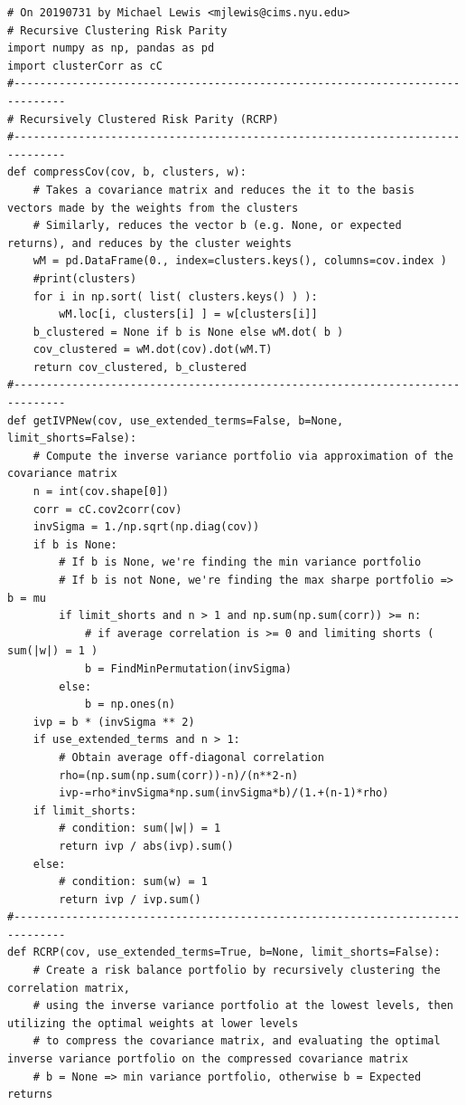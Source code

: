 \documentclass[10pt,twoside,titlepage]{article}   %
\begin{document}
\begin{lstlisting}
# On 20190731 by Michael Lewis <mjlewis@cims.nyu.edu>
# Recursive Clustering Risk Parity
import numpy as np, pandas as pd
import clusterCorr as cC
#------------------------------------------------------------------------------
# Recursively Clustered Risk Parity (RCRP)
#------------------------------------------------------------------------------
def compressCov(cov, b, clusters, w):
    # Takes a covariance matrix and reduces the it to the basis vectors made by the weights from the clusters
    # Similarly, reduces the vector b (e.g. None, or expected returns), and reduces by the cluster weights
    wM = pd.DataFrame(0., index=clusters.keys(), columns=cov.index )
    #print(clusters)
    for i in np.sort( list( clusters.keys() ) ):
        wM.loc[i, clusters[i] ] = w[clusters[i]]
    b_clustered = None if b is None else wM.dot( b )
    cov_clustered = wM.dot(cov).dot(wM.T)
    return cov_clustered, b_clustered
#------------------------------------------------------------------------------
def getIVPNew(cov, use_extended_terms=False, b=None, limit_shorts=False):
    # Compute the inverse variance portfolio via approximation of the covariance matrix
    n = int(cov.shape[0])
    corr = cC.cov2corr(cov)
    invSigma = 1./np.sqrt(np.diag(cov))
    if b is None:
        # If b is None, we're finding the min variance portfolio
        # If b is not None, we're finding the max sharpe portfolio => b = mu
        if limit_shorts and n > 1 and np.sum(np.sum(corr)) >= n:
            # if average correlation is >= 0 and limiting shorts ( sum(|w|) = 1 )
            b = FindMinPermutation(invSigma)
        else:
            b = np.ones(n)
    ivp = b * (invSigma ** 2)
    if use_extended_terms and n > 1:
        # Obtain average off-diagonal correlation
        rho=(np.sum(np.sum(corr))-n)/(n**2-n)
        ivp-=rho*invSigma*np.sum(invSigma*b)/(1.+(n-1)*rho)
    if limit_shorts:
        # condition: sum(|w|) = 1
        return ivp / abs(ivp).sum()
    else:
        # condition: sum(w) = 1
        return ivp / ivp.sum()
#------------------------------------------------------------------------------
def RCRP(cov, use_extended_terms=True, b=None, limit_shorts=False):
    # Create a risk balance portfolio by recursively clustering the correlation matrix,
    # using the inverse variance portfolio at the lowest levels, then utilizing the optimal weights at lower levels
    # to compress the covariance matrix, and evaluating the optimal inverse variance portfolio on the compressed covariance matrix
    # b = None => min variance portfolio, otherwise b = Expected returns


\end{lstlisting}
\end{document}
